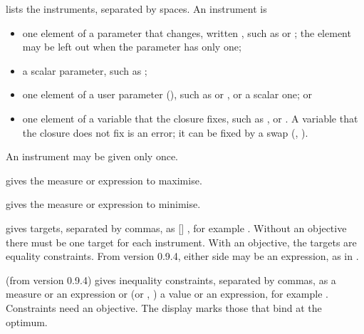 \begin{optdesc}
\item[\optarg{inst}{ruments}{list}] lists the instruments, separated by
spaces. An instrument is
\begin{itemize}\setlength{\itemsep}{0pt}\setlength{\labelsep}{0.6em}
\item one element of a parameter that  changes, written
\cmd{(}\cmd{)}, such as  or
; the element may be left out when the parameter has only
one;
\item a scalar parameter, such as ;
\item one element of a user parameter (), such as
 or , or a scalar one; or
\item one element of a variable that the closure fixes, such as ,
 or . A variable that the closure does not fix is
an error; it can be fixed by a swap (, ).
\end{itemize}
An instrument may be given only once.

\item[\optarg{max}{imize}{objective}] gives the measure or expression to
maximise.

\item[\optarg{min}{imize}{objective}] gives the measure or expression to
minimise.

\item[\optarg{targ}{ets}{spec}] gives targets, separated by commas, as
 [] \cmd{=} , for example
. Without an
objective there must be one target for each instrument. With an objective,
the targets are equality constraints. From version 0.9.4, either side may be
an expression, as in .

\item[\optarg{cons}{traints}{spec}] (from version 0.9.4) gives inequality
constraints, separated by commas, as a measure or an expression \cmd{<=} or
\cmd{>=} (or , ) a value or an expression, for example
.
Constraints need an objective. The display marks those that bind at the
optimum.


\end{optdesc}
